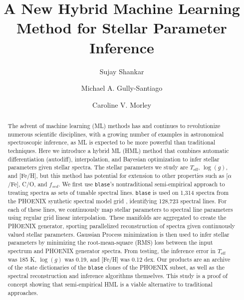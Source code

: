 \documentclass[twocolumn, linenumbers]{aastex631}
\begin{document}
\title{A New Hybrid Machine Learning Method for Stellar Parameter Inference}
\author[0000-0002-2290-6810]{Sujay Shankar}
\author[0000-0002-4020-3457]{Michael A. Gully-Santiago}
\author[0000-0002-4404-0456]{Caroline V. Morley}


\begin{abstract}
    The advent of machine learning (ML) methods has and continues to revolutionize numerous scientific disciplines, with a growing number of examples in astronomical spectroscopic inference, as ML is expected to be more powerful than traditional techniques.
    Here we introduce a hybrid ML (HML) method that combines automatic differentiation (autodiff), interpolation, and Bayesian optimization to infer stellar parameters given stellar spectra.
    The stellar parameters we study are $T_{\mathrm{eff}}$, $\log(g)$, and [Fe/H], but this method has potential for extension to other properties such as [$\alpha$/Fe], C/O, and $f_{sed}$.
    We first use \texttt{blase}'s \citep{blase} nontraditional semi-empirical approach to treating spectra as sets of tunable spectral lines. 
    \texttt{blase} is used on 1,314 spectra from the PHOENIX synthetic spectral model grid \citep{PHOENIX}, identifying 128,723 spectral lines.
    For each of these lines, we continuously map stellar parameters to spectral line parameters using regular grid linear interpolation.
    These manifolds are aggregated to create the PHOENIX generator, sporting parallelized reconstruction of spectra given continuously valued stellar parameters.
    Gaussian Process minimization is then used to infer stellar parameters by minimizing the root-mean-square (RMS) loss between the input spectrum and PHOENIX generator spectra.
    From testing, the inference error in $T_{\mathrm{eff}}$ was 185 K, $\log(g)$ was 0.19, and [Fe/H] was 0.12 dex.
    Our products are an archive of the state dictionaries of the \texttt{blase} clones of the PHOENIX subset, as well as the spectral reconstruction and inference algorithms themselves.
    This study is a proof of concept showing that semi-empirical HML is a viable alternative to traditional approaches.
\end{abstract}
\end{document}
